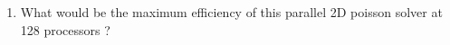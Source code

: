 \documentclass[11pt,a4paper]{article}
\begin{document}
\begin{exercise}

  $~$ %

\begin{enumerate}[label=(\alph*)]
	\item What would be the maximum efficiency of this parallel 2D poisson solver at 128 processors ?

\end{enumerate}
  

\end{exercise}
\end{document}
